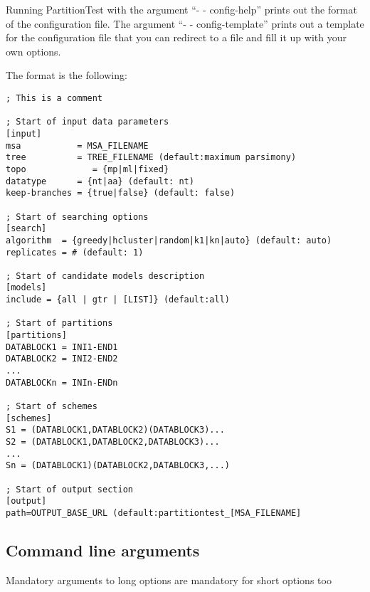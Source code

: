 \documentclass[11pt,twoside,a4paper]{article}
\begin{document}
Running PartitionTest with the argument ``- - config-help'' prints out the format of the
configuration file. The argument ``- - config-template'' prints out a template for the
configuration file that you can redirect to a file and fill it up with your own options.

The format is the following:

\begin{verbatim}
; This is a comment

; Start of input data parameters
[input]
msa           = MSA_FILENAME
tree          = TREE_FILENAME (default:maximum parsimony)
topo	         = {mp|ml|fixed}
datatype      = {nt|aa} (default: nt)
keep-branches = {true|false} (default: false)

; Start of searching options
[search]
algorithm  = {greedy|hcluster|random|k1|kn|auto} (default: auto)
replicates = # (default: 1)

; Start of candidate models description
[models]
include = {all | gtr | [LIST]} (default:all)

; Start of partitions
[partitions]
DATABLOCK1 = INI1-END1
DATABLOCK2 = INI2-END2
...
DATABLOCKn = INIn-ENDn

; Start of schemes
[schemes]
S1 = (DATABLOCK1,DATABLOCK2)(DATABLOCK3)...
S2 = (DATABLOCK1,DATABLOCK2,DATABLOCK3)...
...
Sn = (DATABLOCK1)(DATABLOCK2,DATABLOCK3,...)

; Start of output section
[output]
path=OUTPUT_BASE_URL (default:partitiontest_[MSA_FILENAME]
\end{verbatim}

\subsection{Command line arguments}

Mandatory arguments to long options are mandatory for short options too
\end{document}
